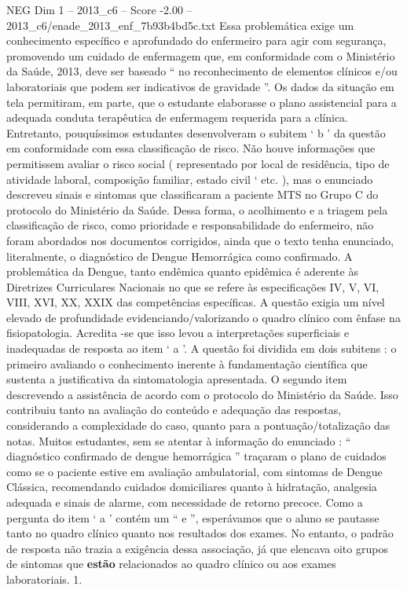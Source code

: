 \begin{textsample}{NEG Dim 1 – 2013\_c6 – Score -2.00 – 2013\_c6/enade\_2013\_enf\_7b93b4bd5c.txt}
Essa problemática exige um conhecimento específico e aprofundado do enfermeiro para agir com segurança, promovendo um cuidado de enfermagem que, em conformidade com o Ministério da Saúde, 2013, deve ser baseado “ no reconhecimento de elementos clínicos e/ou laboratoriais que podem ser indicativos de gravidade ”.
Os dados da situação em tela permitiram, em parte, que o estudante elaborasse o plano assistencial para a adequada conduta terapêutica de enfermagem requerida para a clínica.
Entretanto, pouquíssimos estudantes desenvolveram o subitem ‘ b ’ da questão em conformidade com essa classificação de risco.
Não houve informações que permitissem avaliar o risco social ( representado por local de residência, tipo de atividade laboral, composição familiar, estado civil ‘ etc. ), mas o enunciado descreveu sinais e sintomas que classificaram a paciente MTS no Grupo C do protocolo do Ministério da Saúde.
Dessa forma, o acolhimento e a triagem pela classificação de risco, como prioridade e responsabilidade do enfermeiro, não foram abordados nos documentos corrigidos, ainda que o texto tenha enunciado, literalmente, o diagnóstico de Dengue Hemorrágica como confirmado.
A problemática da Dengue, tanto endêmica quanto epidêmica é aderente às Diretrizes Curriculares Nacionais no que se refere às especificações IV, V, VI, VIII, XVI, XX, XXIX das competências específicas.
A questão exigia um nível elevado de profundidade evidenciando/valorizando o quadro clínico com ênfase na fisiopatologia.
Acredita -se que isso levou a interpretações superficiais e inadequadas de resposta ao item ‘ a ’.
A questão foi dividida em dois subitens : o primeiro avaliando o conhecimento inerente à fundamentação científica que sustenta a justificativa da sintomatologia apresentada.
O segundo item descrevendo a assistência de acordo com o protocolo do Ministério da Saúde.
Isso contribuiu tanto na avaliação do conteúdo e adequação das respostas, considerando a complexidade do caso, quanto para a pontuação/totalização das notas.
Muitos estudantes, sem se atentar à informação do enunciado : “ diagnóstico confirmado de dengue hemorrágica ” traçaram o plano de cuidados como se o paciente estive em avaliação ambulatorial, com sintomas de Dengue Clássica, recomendando cuidados domiciliares quanto à hidratação, analgesia adequada e sinais de alarme, com necessidade de retorno precoce.
Como a pergunta do item ‘ a ’ contém um “ e ”, esperávamos que o aluno se pautasse tanto no quadro clínico quanto nos resultados dos exames.
No entanto, o padrão de resposta não trazia a exigência dessa associação, já que elencava oito grupos de sintomas que \textbf{estão} relacionados ao quadro clínico ou aos exames laboratoriais. 1.

\end{textsample}
